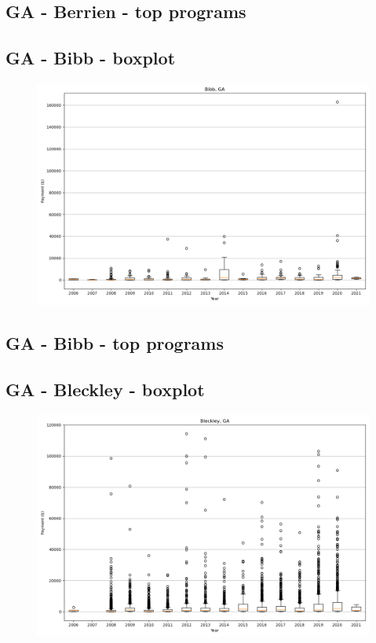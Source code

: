 \subsection*{GA - Berrien - top programs}

\newpage
\subsection*{GA - Bibb - boxplot}
\begin{figure}[h]
\centering
\includegraphics[width=7in]{../output/boxplots/counties/Bibb-GA_boxplot.png}
\end{figure}


\subsection*{GA - Bibb - top programs}

\newpage
\subsection*{GA - Bleckley - boxplot}
\begin{figure}[h]
\centering
\includegraphics[width=7in]{../output/boxplots/counties/Bleckley-GA_boxplot.png}
\end{figure}


